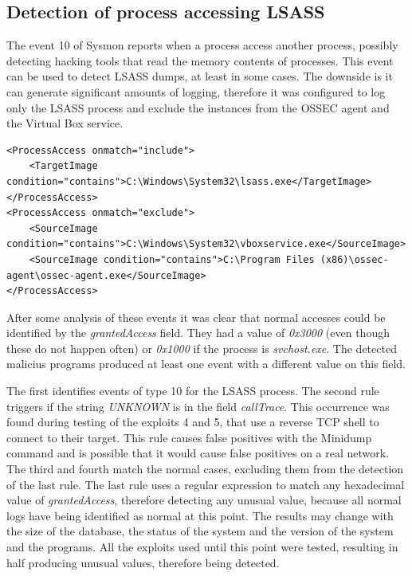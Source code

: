 \subsection{Detection of process accessing LSASS} \label{detect_lsass}
The event 10 of Sysmon reports when a process access another process, possibly detecting hacking tools that read the memory contents of processes\cite{sysmon}.
This event can be used to detect LSASS dumps, at least in some cases\cite{sysmon_event_10_lsass}.
\linej
The downside is it can generate significant amounts of logging, therefore it was configured to log only the LSASS process and exclude the instances from the OSSEC agent and the Virtual Box service.
\linej
\begin{lstlisting}[style=xml,caption=Sysmon monitoring with event 10 for lsass reads,captionpos=b]
<ProcessAccess onmatch="include">
	<TargetImage condition="contains">C:\Windows\System32\lsass.exe</TargetImage>
</ProcessAccess>
<ProcessAccess onmatch="exclude">
	<SourceImage condition="contains">C:\Windows\System32\vboxservice.exe</SourceImage>
	<SourceImage condition="contains">C:\Program Files (x86)\ossec-agent\ossec-agent.exe</SourceImage>
</ProcessAccess>
\end{lstlisting}
\linej
After some analysis of these events it was clear that normal accesses could be identified by the \textit{grantedAccess} field. They had a value of \textit{0x3000} (even though these do not happen often) or \textit{0x1000} if the process is \textit{svchost.exe}. The detected malicius programs produced at least one event with a different value on this field.
\linej

\linej
The first identifies events of type 10 for the LSASS process.
\linej
The second rule triggers if the string \textit{UNKNOWN} is in the field \textit{callTrace}. This occurrence was found during testing of the exploits 4 and 5, that use a reverse TCP shell to connect to their target. This rule causes false positives with the Minidump command and is possible that it would cause false positives on a real network.
\linej
The third and fourth match the normal cases, excluding them from the detection of the last rule.
\linej
The last rule uses a regular expression to match any hexadecimal value of \textit{grantedAccess}, therefore detecting any unusual value, because all normal logs have being identified as normal at this point.
\linej
\linej
The results may change with the size of the database, the status of the system and the version of the system and the programs.
All the exploits used until this point were tested, resulting in half producing unusual values, therefore being detected.


